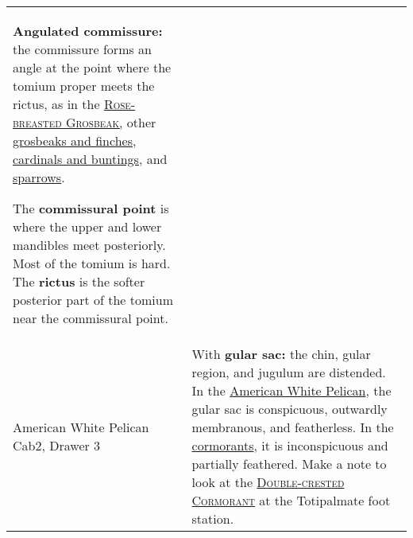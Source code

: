 \documentclass[10pt]{article}
\newif\ifprintkey
\newcommand{\PrintKey}[1]{\ifprintkey{\textbf{#1}}\fi}
\begin{document}
\begin{longtable}{@{}C{0.45\textwidth}L{0.45\textwidth}@{}}
\textbf{Angulated commissure:} the commissure forms an angle at the point where the tomium proper meets the rictus, as in the \href{https://www.allaboutbirds.org/guide/Rose-breasted_Grosbeak}{\textsc{Rose-breasted Grosbeak,}} other  \href{https://www.allaboutbirds.org/guide/browse/taxonomy/Fringillidae}{grosbeaks and finches}, \href{https://www.allaboutbirds.org/guide/browse/taxonomy/Cardinalidae}{cardinals and buntings}, and \href{https://www.allaboutbirds.org/guide/browse/taxonomy/Passerellidae}{sparrows}. \smallskip 

The \textbf{commissural point} is where the upper and lower mandibles meet posteriorly. Most of the tomium is hard. The \textbf{rictus} is the softer posterior part of the tomium near the commissural point.\\ [2.5cm]
%
\PrintKey{American White Pelican \newline Cab2, Drawer 3} & 
With \textbf{gular sac:} the chin, gular region, and jugulum are distended. In the \href{https://www.allaboutbirds.org/guide/American_White_Pelican/}{American White Pelican}, the gular sac is conspicuous, outwardly membranous, and featherless. In the \href{https://www.allaboutbirds.org/guide/browse/taxonomy/Phalacrocoracidae}{cormorants}, it is inconspicuous and partially feathered. Make a note to look at the \href{https://www.allaboutbirds.org/guide/Double-crested_Cormorant}{\textsc{Double-crested Cormorant}} at the Totipalmate foot station. \\ [2.5cm]



\end{longtable}
\end{document}
